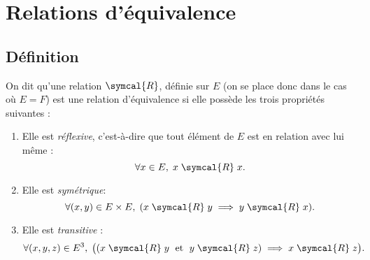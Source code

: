 %

\section{Relations d'équivalence}
\subsection{Définition}
On dit qu'une relation $\symcal{R}$, définie sur $E$ (on se place donc dans le cas où $E=F$) est une relation d'équivalence si elle possède les trois propriétés suivantes :
\begin{enumerate}
\item Elle est \emph{réflexive}, c'est-à-dire que tout élément de $E$ est en relation avec lui même :
\[\forall x \in E,\; x\mathrel{\symcal{R}}x.\]
\item Elle est \emph{symétrique}:
\[\forall (x,y)\in E\times E,\; (x\mathrel{\symcal{R}}y \implies y\mathrel{\symcal{R}}x).\]
\item Elle est \emph{transitive} :
\[
\forall (x,y,z)\in E^3,\; \bigl((x\mathrel{\symcal{R}}y\;\text{ et }\;y\mathrel{\symcal{R}}z)\implies x\mathrel{\symcal{R}}z\bigr).
\]
\end{enumerate}

